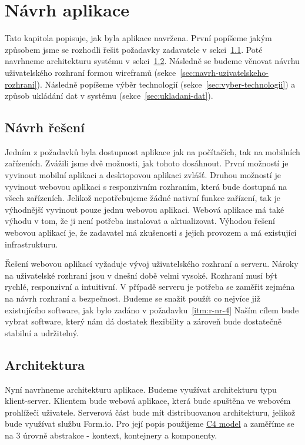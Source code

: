 \chapter{Návrh aplikace}\label{ch:navrh-aplikace}

Tato kapitola popisuje, jak byla aplikace navržena.
První popíšeme jakým způsobem jsme se rozhodli řešit požadavky zadavatele v sekci~\ref{sec:navrh-reseni}.
Poté navrhneme architekturu systému v sekci~\ref{sec:architektura}.
Následně se budeme věnovat návrhu uživatelského rozhraní formou wireframů (sekce~\ref{sec:navrh-uzivatelskeho-rozhrani}).
Následně popíšeme výběr technologií (sekce~\ref{sec:vyber-technologii}) a způsob ukládání dat v systému (sekce~\ref{sec:ukladani-dat}).


\section{Návrh řešení}\label{sec:navrh-reseni}

Jedním z požadavků byla dostupnost aplikace jak na počítačích, tak na mobilních zařízeních.
Zvážili jsme dvě možnosti, jak tohoto dosáhnout.
První možností je vyvinout mobilní aplikaci a desktopovou aplikaci zvlášť.
Druhou možností je vyvinout webovou aplikaci s responzivním rozhraním, která bude dostupná na všech zařízeních.
Jelikož nepotřebujeme žádné nativní funkce zařízení, tak je výhodnější vyvinout pouze jednu webovou aplikaci.
Webová aplikace má také výhodu v tom, že ji není potřeba instalovat a aktualizovat.
Výhodou řešení webovou aplikací je, že zadavatel má zkušenosti s jejich provozem a má existující infrastrukturu.

Řešení webovou aplikací vyžaduje vývoj uživatelského rozhraní a serveru.
Nároky na uživatelské rozhraní jsou v dnešní době velmi vysoké.
Rozhraní musí být rychlé, responzivní a intuitivní.
V případě serveru je potřeba se zaměřit zejména na návrh rozhraní a bezpečnost.
Budeme se snažit použít co nejvíce již existujícího software, jak bylo zadáno v požadavku~\ref{itm:r-nr-4}
Naším cílem bude vybrat software, který nám dá dostatek flexibility a zároveň bude dostatečně stabilní a udržitelný.


\section{Architektura}\label{sec:architektura}

Nyní navrhneme architekturu aplikace.
Budeme využívat architekturu typu klient-server.
Klientem bude webová aplikace, která bude spuštěna ve webovém prohlížeči uživatele.
Serverová část bude mít distribuovanou architekturu, jelikož bude využívat službu Form.io.
Pro její popis použijeme \href{https://c4model.com/}{C4 model} a zaměříme se na 3 úrovně abstrakce - kontext, kontejnery a komponenty.

